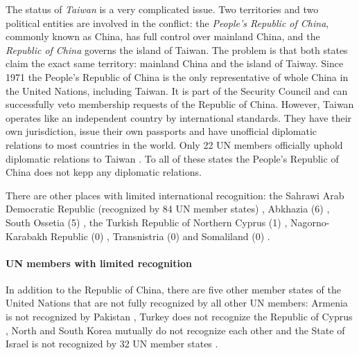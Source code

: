 The status of \emph{Taiwan} is a very complicated issue. Two territories and two political entities are involved in the conflict: the \emph{People's Republic of China}, commonly known as China, has full control over mainland China, and the \emph{Republic of China} governs the island of Taiwan. The problem is that both states claim the exact same territory: mainland China and the island of Taiway. Since 1971 the People's Republic of China is the only representative of whole China in the United Nations, including Taiwan. It is part of the Security Council and can successfully veto membership requests of the Republic of China. However, Taiwan operates like an independent country by international standards. They have their own jurisdiction, issue their own passports and have unofficial diplomatic relations to most countries in the world. Only 22 UN members officially uphold diplomatic relations to Taiwan \cite{TaiwanRecognition}. To all of these states the People's Republic of China does not kepp any diplomatic relations.

There are other places with limited international recognition: the Sahrawi Arab Democratic Republic (recognized by 84 UN member states) \cite{WesternSaharaRecognition}, Abkhazia (6) \cite{AbkhaziaRecognition}, South Ossetia (5) \cite{SouthOssetiaRecognition}, the Turkish Republic of Northern Cyprus (1) \cite{NorthernCyprusRecognition}, Nagorno-Karabakh Republic (0) \cite{NagornoRecognition}, Transnistria (0) \cite{TransnistriaRecognition} and Somaliland (0) \cite{SomalilandRecognition}.


\paragraph{UN members with limited recognition} %
\label{par:un_members_with_limited_recognition}

In addition to the Republic of China, there are five other member states of the United Nations that are not fully recognized by all other UN members: Armenia is not recognized by Pakistan \cite{ArmeniaRecognition}, Turkey does not recognize the Republic of Cyprus \cite{CyprusRecognition}, North and South Korea mutually do not recognize each other \cite{KoreaRecognition} and the State of Israel is not recognized by 32 UN member states \cite{IsraelRecognition}.


